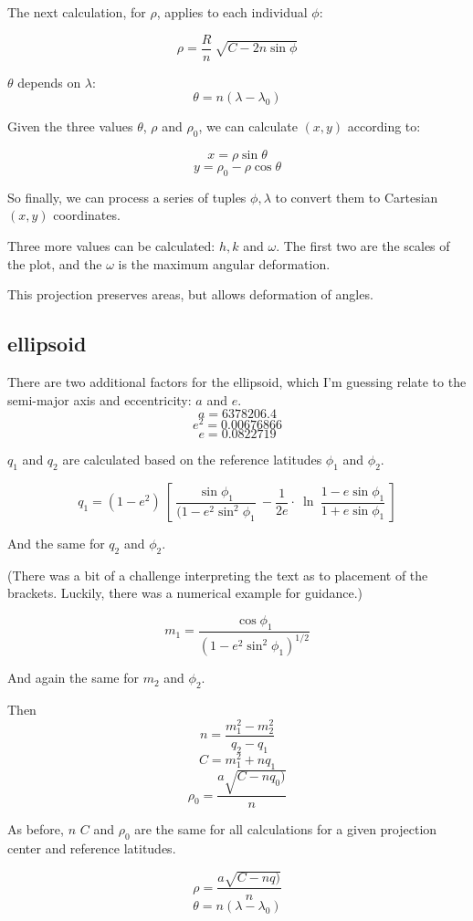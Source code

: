 \documentclass[11pt, oneside]{article}
\begin{document}
The next calculation, for $\rho$, applies to each individual $\phi$:

\[ \rho = \frac{R}{n} \ \sqrt{C - 2n \sin \phi} \]

$\theta$ depends on $\lambda$:
\[ \theta = n(\lambda - \lambda_0) \]

Given the three values $\theta$, $\rho$ and $\rho_0$, we can calculate $(x,y)$ according to:

\[ x = \rho \sin \theta \]
\[ y = \rho_0 - \rho \cos \theta \]

So finally, we can process a series of tuples $\phi, \lambda$ to convert them to Cartesian $(x,y)$ coordinates.

Three more values can be calculated:  $h, k$ and $\omega$.  The first two are the scales of the plot, and the $\omega$ is the maximum angular deformation.

This projection preserves areas, but allows deformation of angles.

\subsection*{ellipsoid}

There are two additional factors for the ellipsoid, which I'm guessing relate to the semi-major axis and eccentricity:   $a$ and $e$.
\[ a = 6378206.4 \]
\[ e^2 = 0.00676866 \]
\[ e = 0.0822719 \]

$q_1$ and $q_2$ are calculated based on the reference latitudes $\phi_1$ and $\phi_2$.

\[ q_1 = (1-e^2) \ [ \  \frac{\sin \phi_1}{(1- e^2 \sin^2 \phi_1} \  - \frac{1}{2e} \cdot\ \ln \ \frac{1 - e \sin \phi_1}{1 + e \sin \phi_1} \ ] \]

And the same for $q_2$ and $\phi_2$.

(There was a bit of a challenge interpreting the text as to placement of the brackets.  Luckily, there was a numerical example for guidance.)

\[ m_1 = \frac{\cos \phi_1}{(1 - e^2 \sin^2 \phi_1)^{1/2}} \]

And again the same for $m_2$ and $\phi_2$.

Then
\[ n = \frac{m_1^2 - m_2^2}{q_2 - q_1} \]
\[ C = m_1^2 + nq_1 \]
\[ \rho_0 = \frac{a \sqrt{C - nq_0)} }{n} \]

As before, $n$ $C$ and $\rho_0$ are the same for all calculations for a given projection center and reference latitudes.

\[ \rho = \frac{a \sqrt{C - nq)} }{n} \]
\[ \theta = n (\lambda - \lambda_0) \]
\end{document}
